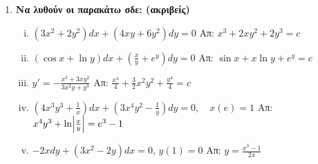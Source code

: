 \documentclass[a4paper,table]{report}
\begin{document}
\begin{enumerate}
  \item {\bfseries Να λυθούν οι παρακάτω σδε: (ακριβείς)}
    \begin{enumerate}[i)]
      \item $ (3x^{2}+2y^{2})dx+(4xy+6y^{2})dy=0  $ 
        \hfill Απ: $ x^{3}+2xy^{2}+2y^{3}=c $ 
      \item $ (\cos{x} + \ln{y})dx + \left(\frac{x}{y} + e^{y}\right)dy=0 $ 
        \hfill Απ: $ \sin{x} + x \ln{y} + e^{y}=c $ 
      \item $ y'=- \frac{x^{3}+3xy^{2}}{3x^{2}y+y^{3}} $ 
        \hfill Απ: $ \frac{x^{4}}{4}+\frac{3}{2} x^{2}y^{2}+\frac{y^{4}}{4} = c $ 
      \item $\left(4x^3y^3+\frac{1}{x}\right)dx+\left(3x^4y^2-
        \frac{1}{y}\right)dy=0, \quad x(e)=1$
        \hfill Απ: $x^4y^3+\ln \Bigl|\frac{x}{y}\Bigr|=e^3-1$
      \item $ -2xdy + (3x^{2}-2y)dx=0 $, \quad $ y(1)=0 $ 
        \hfill Απ: $ y= \frac{x^{3}-1}{2x} $ 
    \end{enumerate}


\end{enumerate}
\end{document}
